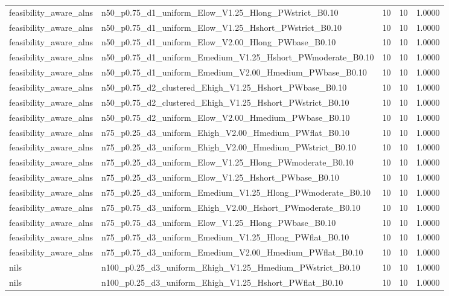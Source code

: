 \begin{tabular}{llrrr}
feasibility_aware_alns & n50_p0.75_d1_uniform_Elow_V1.25_Hlong_PWstrict_B0.10 & 10 & 10 & 1.0000 \\
feasibility_aware_alns & n50_p0.75_d1_uniform_Elow_V1.25_Hshort_PWstrict_B0.10 & 10 & 10 & 1.0000 \\
feasibility_aware_alns & n50_p0.75_d1_uniform_Elow_V2.00_Hlong_PWbase_B0.10 & 10 & 10 & 1.0000 \\
feasibility_aware_alns & n50_p0.75_d1_uniform_Emedium_V1.25_Hshort_PWmoderate_B0.10 & 10 & 10 & 1.0000 \\
feasibility_aware_alns & n50_p0.75_d1_uniform_Emedium_V2.00_Hmedium_PWbase_B0.10 & 10 & 10 & 1.0000 \\
feasibility_aware_alns & n50_p0.75_d2_clustered_Ehigh_V1.25_Hshort_PWbase_B0.10 & 10 & 10 & 1.0000 \\
feasibility_aware_alns & n50_p0.75_d2_clustered_Ehigh_V1.25_Hshort_PWstrict_B0.10 & 10 & 10 & 1.0000 \\
feasibility_aware_alns & n50_p0.75_d2_uniform_Elow_V2.00_Hmedium_PWbase_B0.10 & 10 & 10 & 1.0000 \\
feasibility_aware_alns & n75_p0.25_d3_uniform_Ehigh_V2.00_Hmedium_PWflat_B0.10 & 10 & 10 & 1.0000 \\
feasibility_aware_alns & n75_p0.25_d3_uniform_Ehigh_V2.00_Hmedium_PWstrict_B0.10 & 10 & 10 & 1.0000 \\
feasibility_aware_alns & n75_p0.25_d3_uniform_Elow_V1.25_Hlong_PWmoderate_B0.10 & 10 & 10 & 1.0000 \\
feasibility_aware_alns & n75_p0.25_d3_uniform_Elow_V1.25_Hshort_PWbase_B0.10 & 10 & 10 & 1.0000 \\
feasibility_aware_alns & n75_p0.25_d3_uniform_Emedium_V1.25_Hlong_PWmoderate_B0.10 & 10 & 10 & 1.0000 \\
feasibility_aware_alns & n75_p0.75_d3_uniform_Ehigh_V2.00_Hshort_PWmoderate_B0.10 & 10 & 10 & 1.0000 \\
feasibility_aware_alns & n75_p0.75_d3_uniform_Elow_V1.25_Hlong_PWbase_B0.10 & 10 & 10 & 1.0000 \\
feasibility_aware_alns & n75_p0.75_d3_uniform_Emedium_V1.25_Hlong_PWflat_B0.10 & 10 & 10 & 1.0000 \\
feasibility_aware_alns & n75_p0.75_d3_uniform_Emedium_V2.00_Hmedium_PWflat_B0.10 & 10 & 10 & 1.0000 \\
nils & n100_p0.25_d3_uniform_Ehigh_V1.25_Hmedium_PWstrict_B0.10 & 10 & 10 & 1.0000 \\
nils & n100_p0.25_d3_uniform_Ehigh_V1.25_Hshort_PWflat_B0.10 & 10 & 10 & 1.0000 \\

\end{tabular}
